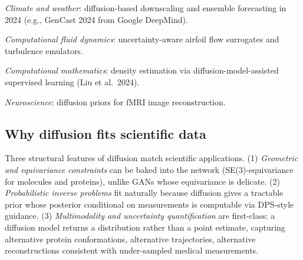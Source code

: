 \documentclass{article}
\begin{document}
\emph{Climate and weather}: diffusion-based downscaling and ensemble forecasting in 2024 (e.g., GenCast 2024 from Google DeepMind).

\emph{Computational fluid dynamics}: uncertainty-aware airfoil flow surrogates \citep{liu2023zero1to3zeroshoton} and turbulence emulators.

\emph{Computational mathematics}: density estimation via diffusion-model-assisted supervised learning (Liu et al.~2024).

\emph{Neuroscience}: diffusion priors for fMRI image reconstruction.

\subsection{Why diffusion fits scientific data}\label{why-diffusion-fits-scientific-data}

Three structural features of diffusion match scientific applications. (1) \emph{Geometric and equivariance constraints} can be baked into the network (SE(3)-equivariance for molecules and proteins), unlike GANs whose equivariance is delicate. (2) \emph{Probabilistic inverse problems} fit naturally because diffusion gives a tractable prior whose posterior conditional on measurements is computable via DPS-style guidance. (3) \emph{Multimodality and uncertainty quantification} are first-class: a diffusion model returns a distribution rather than a point estimate, capturing alternative protein conformations, alternative trajectories, alternative reconstructions consistent with under-sampled medical measurements.
\end{document}
